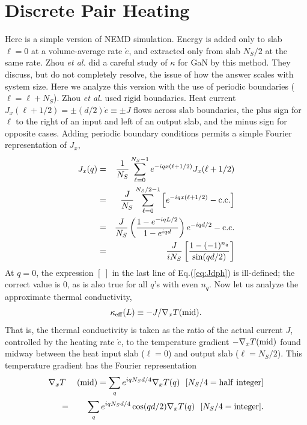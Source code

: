 \documentclass[aps,prb,twocolumn,showpacs,superscriptaddress]{revtex4-1}\begin{tiny}\end{tiny}
\begin{document}
\section{Discrete Pair Heating}

Here is a simple version of NEMD simulation.
Energy is added only to slab $\ell=0$ at a volume-average rate $\dot{e}$, 
and extracted only from slab $N_S/2$
at the same rate.  Zhou {\it et al.} \cite{Zhou} did a careful
study of $\kappa$ for GaN by this method.  They discuss, but do not completely resolve, the
issue of how the answer scales with system size.  Here we analyze this
version with the use of periodic boundaries ($\ell=\ell+N_S$).  Zhou {\it et al.} used rigid boundaries. 
Heat current $J_x(\ell+1/2)=\pm (d/2)\dot{e} \equiv \pm J$ flows across
slab boundaries, the plus sign for $\ell$ to the right of an input and left of an output slab, and
the minus sign for opposite cases.  Adding periodic boundary conditions 
permits a simple Fourier representation of $J_x$,
%
\begin{eqnarray}
J_x(q)&=&\frac{1}{N_S} \sum_{\ell=0}^{N_S-1} e^{-iqx(\ell+1/2)} J_x(\ell+1/2) \nonumber \\
&=& \frac{J}{N_S}\sum_{\ell=0}^{N_S/2-1} \left[e^{-iqx(\ell+1/2)} - {\rm c.c.} \right] \nonumber \\
&=& \frac{J}{N_S} \left( \frac{1-e^{-iqL/2}}{1-e^{iqd}} \right) e^{-iqd/2} - {\rm c.c.} \nonumber \\
&=& \frac{J}{iN_S} \left[ \frac{1-(-1)^{n_q}}{\sin(qd/2)} \right]
\label{eq:Jdph}
\end{eqnarray}
%
At $q=0$, the expression $[ \ ]$ in the last line 
of Eq.(\ref{eq:Jdph}) is ill-defined; the correct value is 0, as is also true for all $q$'s with even $n_q$.
Now let us analyze the approximate thermal conductivity,
%
\begin{equation}
\kappa_{\rm eff}(L) \equiv -J/\nabla_x T({\rm mid}).
\label{eq:keff}
\end{equation}
%
That is, the thermal conductivity is taken as the ratio of the actual current $J$, controlled by the
heating rate $\dot{e}$, to the temperature gradient $-\nabla_x T({\rm mid})$ found midway between the 
heat input slab ($\ell=0$) and output slab ($\ell=N_S/2$).  This temperature gradient has the Fourier 
representation
%
\begin{eqnarray}
\nabla_x &T& ({\rm mid}) = \sum_q e^{iqN_Sd/4} \nabla_x T(q) \ \ [N_S/4={\rm half \ integer}] \nonumber \\
&=& \sum_q e^{iqN_Sd/4} \cos(qd/2) \nabla_x T(q) \ \ [N_S/4={\rm  integer}].
\label{eq:nabTdph}
\end{eqnarray}
\end{document}
